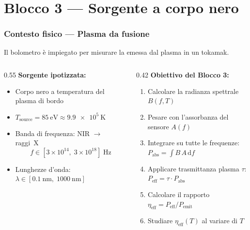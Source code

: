 
\section{Blocco 3 --- Sorgente a corpo nero}

\begin{frame}
\frametitle{Contesto fisico --- Plasma da fusione}

Il bolometro \`e impiegato per misurare la 
emessa dal plasma in un tokamak.

\vspace{0.4em}
\begin{columns}[T]
  \begin{column}{0.55\textwidth}
    \textbf{Sorgente ipotizzata:}
    \begin{itemize}
      \item Corpo nero a temperatura del plasma di bordo
      \item $T_\text{source} = \SI{85}{\electronvolt}
            \approx \SI{9.9e5}{\kelvin}$
      \item Banda di frequenza: NIR $\to$ raggi~X
        \[
          f \in [3\times10^{14},\; 3\times10^{18}]\;\si{\hertz}
        \]
      \item Lunghezze d'onda: $\lambda \in [\SI{0.1}{\nano\meter},\; \SI{1000}{\nano\meter}]$
    \end{itemize}
  \end{column}
  \begin{column}{0.42\textwidth}
    \textbf{Obiettivo del Blocco 3:}
    \begin{enumerate}
      \item Calcolare la radianza spettrale $B(f,T)$
      \item Pesare con l'assorbanza del sensore $A(f)$
      \item Integrare su tutte le frequenze:\\
            $P_\text{abs} = \int B\,A\,\mathrm{d}f$
      \item Applicare trasmittanza plasma $\tau$:\\
            $P_\text{eff} = \tau \cdot P_\text{abs}$
      \item Calcolare il rapporto\\
            $\eta_\text{eff} = P_\text{eff} / P_\text{emit}$
      \item Studiare $\eta_\text{eff}(T)$ al variare di $T$
    \end{enumerate}
  \end{column}
\end{columns}

\end{frame}

